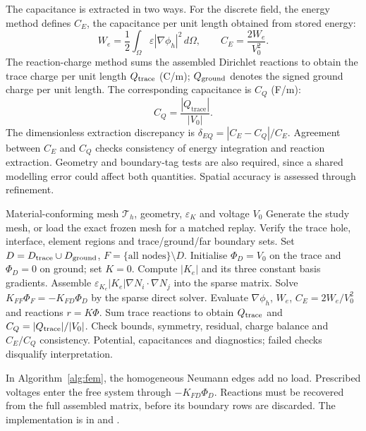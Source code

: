 \documentclass[11pt]{article}
\begin{document}
The capacitance is extracted in two ways. For the discrete field, the energy method defines $C_E$, the capacitance per unit length obtained from stored energy:
\[
W_e=\frac12\int_{\Omega}\varepsilon |\nabla \phi_h|^2\,d\Omega,\qquad
C_E=\frac{2W_e}{V_0^2}.
\]
The reaction-charge method sums the assembled Dirichlet reactions to obtain the trace charge per unit length $Q_{\rm trace}$ (C/m); $Q_{\rm ground}$ denotes the signed ground charge per unit length. The corresponding capacitance is $C_Q$ (F/m):
\[
C_Q=\frac{|Q_{\mathrm{trace}}|}{|V_0|}.
\]
The dimensionless extraction discrepancy is $\delta_{EQ}=|C_E-C_Q|/C_E$. Agreement between $C_E$ and $C_Q$ checks consistency of energy integration and reaction extraction. Geometry and boundary-tag tests are also required, since a shared modelling error could affect both quantities. Spatial accuracy is assessed through refinement.

\medskip
\begin{algorithm}[H]
\caption{Microstrip $P_1$ FEM solver}\label{alg:fem}
\begin{algorithmic}[1]
\Require Material-conforming mesh $\mathcal T_h$, geometry, $\varepsilon_K$ and voltage $V_0$
\State Generate the study mesh, or load the exact frozen mesh for a matched replay.
\State Verify the trace hole, interface, element regions and trace/ground/far boundary sets.
\State Set $D=D_{\rm trace}\cup D_{\rm ground}$, $F=\{\text{all nodes}\}\setminus D$.
\State Initialise $\Phi_D=V_0$ on the trace and $\Phi_D=0$ on ground; set $K=0$.
\State Compute $|K_e|$ and its three constant basis gradients.
\State Assemble $\varepsilon_{K_e}|K_e|\nabla N_i\cdot\nabla N_j$ into the sparse matrix.
\EndFor
\State Solve $K_{FF}\Phi_F=-K_{FD}\Phi_D$ by the sparse direct solver.
\State Evaluate $\nabla\phi_h$, $W_e$, $C_E=2W_e/V_0^2$ and reactions $r=K\Phi$.
\State Sum trace reactions to obtain $Q_{\rm trace}$ and $C_Q=|Q_{\rm trace}|/|V_0|$.
\State Check bounds, symmetry, residual, charge balance and $C_E/C_Q$ consistency.
\Ensure Potential, capacitances and diagnostics; failed checks disqualify interpretation.
\end{algorithmic}
\end{algorithm}
\medskip
In Algorithm~\ref{alg:fem}, the homogeneous Neumann edges add no load. Prescribed voltages enter the free system through $-K_{FD}\Phi_D$. Reactions must be recovered from the full assembled matrix, before its boundary rows are discarded. The implementation is in  and .
\end{document}

